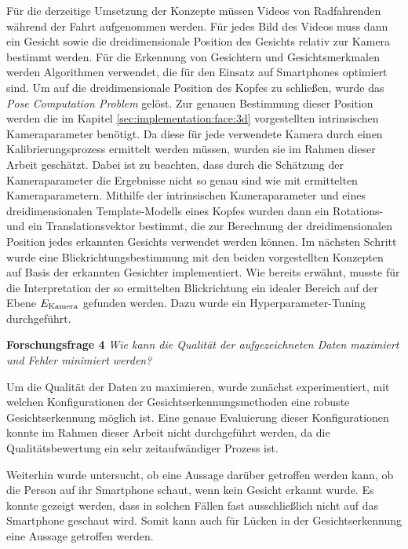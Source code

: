 Für die derzeitige Umsetzung der Konzepte müssen Videos von Radfahrenden während der Fahrt aufgenommen werden. Für jedes Bild des Videos muss dann ein Gesicht sowie die dreidimensionale Position des Gesichts relativ zur Kamera bestimmt werden. Für die Erkennung von Gesichtern und Gesichtsmerkmalen werden Algorithmen verwendet, die für den Einsatz auf Smartphones optimiert sind. Um auf die dreidimensionale Position des Kopfes zu schließen, wurde das \textit{Pose Computation Problem} \cite{paper:pose:problem} gelöst. Zur genauen Bestimmung dieser Position werden die im Kapitel \ref{sec:implementation:face:3d} vorgestellten intrinsischen Kameraparameter benötigt. Da diese für jede verwendete Kamera durch einen Kalibrierungsprozess ermittelt werden müssen, wurden sie im Rahmen dieser Arbeit geschätzt. Dabei ist zu beachten, dass durch die Schätzung der Kameraparameter die Ergebnisse nicht so genau sind wie mit ermittelten Kameraparametern. Mithilfe der intrinsischen Kameraparameter und eines dreidimensionalen Template-Modells eines Kopfes wurden dann ein Rotations- und ein Translationsvektor bestimmt, die zur Berechnung der dreidimensionalen Position jedes erkannten Gesichts verwendet werden können. 
Im nächsten Schritt wurde eine Blickrichtungsbestimmung mit den beiden vorgestellten Konzepten auf Basis der erkannten Gesichter implementiert. Wie bereits erwähnt, musste für die Interpretation der so ermittelten Blickrichtung ein idealer Bereich auf der Ebene $E_{\text{Kamera}}$ gefunden werden. Dazu wurde ein Hyperparameter-Tuning durchgeführt.

\vspace{0.3cm}
\noindent\textbf{Forschungsfrage 4} \textit{Wie kann die Qualität der aufgezeichneten Daten maximiert und Fehler minimiert werden?}
\vspace{0.3cm}

Um die Qualität der Daten zu maximieren, wurde zunächst experimentiert, mit welchen Konfigurationen der Gesichtserkennungsmethoden eine robuste Gesichtserkennung möglich ist. Eine genaue Evaluierung dieser Konfigurationen konnte im Rahmen dieser Arbeit nicht durchgeführt werden, da die Qualitätsbewertung ein sehr zeitaufwändiger Prozess ist.

Weiterhin wurde untersucht, ob eine Aussage darüber getroffen werden kann, ob die Person auf ihr Smartphone schaut, wenn kein Gesicht erkannt wurde. Es konnte gezeigt werden, dass in solchen Fällen fast ausschließlich nicht auf das Smartphone geschaut wird. Somit kann auch für Lücken in der Gesichtserkennung eine Aussage getroffen werden.

